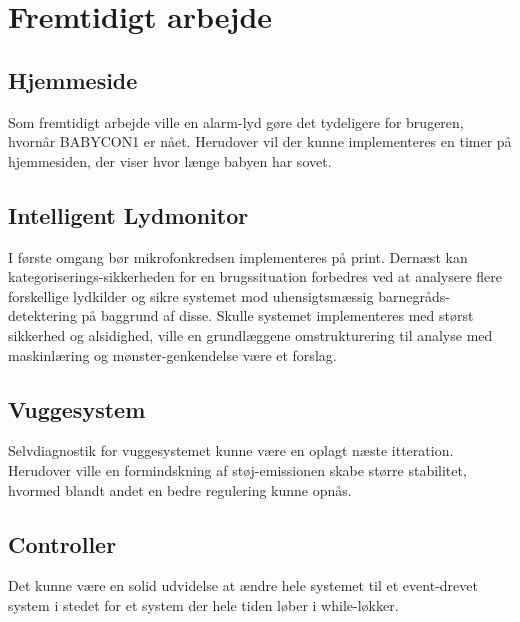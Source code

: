 \chapter{Fremtidigt arbejde}
\label{fremtidigtArbejde}

\section*{Hjemmeside}
Som fremtidigt arbejde ville en alarm-lyd gøre det tydeligere for brugeren, hvornår BABYCON1 er nået. Herudover vil der kunne implementeres en timer på hjemmesiden, der viser hvor længe babyen har sovet. 

\section*{Intelligent Lydmonitor}
I første omgang bør mikrofonkredsen implementeres på print. Dernæst kan kategoriserings-sikkerheden for en brugssituation forbedres ved at analysere flere forskellige lydkilder og sikre systemet mod uhensigtsmæssig barnegråds-detektering på baggrund af disse. Skulle systemet implementeres med størst sikkerhed og alsidighed, ville en grundlæggene omstrukturering til analyse med maskinlæring og mønster-genkendelse være et forslag.

\section*{Vuggesystem}
Selvdiagnostik for vuggesystemet kunne være en oplagt næste itteration. Herudover ville en formindskning af støj-emissionen skabe større stabilitet, hvormed blandt andet en bedre regulering kunne opnås. 

\section*{Controller}
Det kunne være en solid udvidelse at ændre hele systemet til et event-drevet system i stedet for et system der hele tiden løber i while-løkker.
